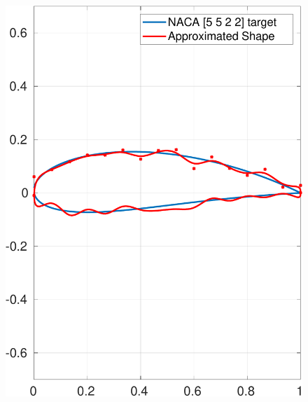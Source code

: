 \documentclass[paper=a4, fontsize=11pt]{scrartcl} %
\begin{document}
\begin{figure}[H]
\begin{minipage}{.5\textwidth}
            \includegraphics[width=.95\linewidth]{a3-shapematch-5522-final}
            \label{fig:solution5522}
        \end{minipage}
    \end{figure}
\end{document}
